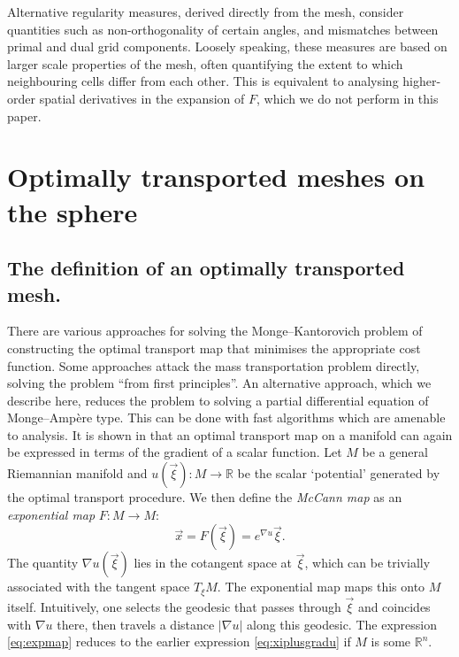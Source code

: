\documentclass[11pt, a4paper]{scrartcl}  %
\theoremstyle{plain}
\theoremstyle{definition}
\numberwithin{equation}{section}
\begin{document}
Alternative regularity measures, derived directly from the mesh,
consider quantities such as non-orthogonality of certain angles, and
mismatches between primal and dual grid components. Loosely speaking,
these measures are based on larger scale properties of the mesh, often
quantifying the extent to which neighbouring cells differ from each
other. This is equivalent to analysing higher-order spatial derivatives
in the expansion of $F$, which we do not perform in this paper.

\section{Optimally transported meshes on the sphere}
\label{sec:otsphere}

\subsection{The definition of an optimally transported mesh.}
\label{ssec:otdef}

There are various approaches for solving the Monge--Kantorovich problem
of constructing the optimal transport map that minimises the appropriate
cost function. Some approaches attack the mass transportation problem
directly, solving the problem ``from first principles''. An alternative
approach, which we describe here, reduces the problem to solving a
partial differential equation of Monge--Ampère type. This can be done
with fast algorithms which are amenable to analysis. It is shown in
\citet{mccann2001polar} that an optimal transport map on a manifold can
again be expressed in terms of the gradient of a scalar function. Let
$M$ be a general Riemannian
manifold and $u(\vec{\xi}): M \to \mathbb{R}$ be the scalar `potential'
generated by the optimal transport procedure. We then define the
\emph{McCann map} as an \emph{exponential map} $F: M \to M$:
\begin{equation}
  \label{eq:expmap}
  \vec{x} = F(\vec{\xi}) = e^{\nabla u} \vec{\xi}.
\end{equation}
The quantity $\nabla u(\vec{\xi})$ lies in the cotangent space at
$\vec{\xi}$, which can be trivially associated with the tangent space
$T_{\xi} M$. The exponential map maps this onto $M$ itself. Intuitively,
one selects the geodesic that passes through $\vec{\xi}$ and coincides
with $\nabla u$ there, then travels a distance $|\nabla u|$ along this
geodesic. The expression \cref{eq:expmap} reduces to the earlier
expression \cref{eq:xiplusgradu} if $M$ is some $\mathbb{R}^n$.
\end{document}
